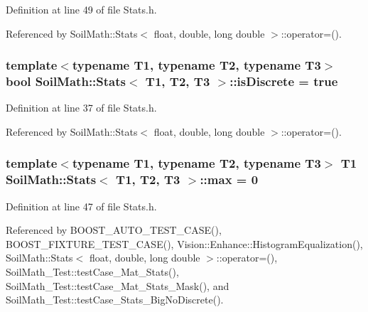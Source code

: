 Definition at line 49 of file Stats.\+h.



Referenced by Soil\+Math\+::\+Stats$<$ float, double, long double $>$\+::operator=().

\hypertarget{class_soil_math_1_1_stats_a2f54bbc8d815345b23ebbd4ba2b302bf}{}
\subsubsection[{is\+Discrete}]{\setlength{\rightskip}{0pt plus 5cm}template$<$typename T1, typename T2, typename T3$>$ bool {\bf Soil\+Math\+::\+Stats}$<$ T1, T2, T3 $>$\+::is\+Discrete = true}\label{class_soil_math_1_1_stats_a2f54bbc8d815345b23ebbd4ba2b302bf}


Definition at line 37 of file Stats.\+h.



Referenced by Soil\+Math\+::\+Stats$<$ float, double, long double $>$\+::operator=().

\hypertarget{class_soil_math_1_1_stats_ad49ee1f533564ec587cf98a094b8c564}{}
\subsubsection[{max}]{\setlength{\rightskip}{0pt plus 5cm}template$<$typename T1, typename T2, typename T3$>$ T1 {\bf Soil\+Math\+::\+Stats}$<$ T1, T2, T3 $>$\+::max = 0}\label{class_soil_math_1_1_stats_ad49ee1f533564ec587cf98a094b8c564}


Definition at line 47 of file Stats.\+h.



Referenced by B\+O\+O\+S\+T\+\_\+\+A\+U\+T\+O\+\_\+\+T\+E\+S\+T\+\_\+\+C\+A\+S\+E(), B\+O\+O\+S\+T\+\_\+\+F\+I\+X\+T\+U\+R\+E\+\_\+\+T\+E\+S\+T\+\_\+\+C\+A\+S\+E(), Vision\+::\+Enhance\+::\+Histogram\+Equalization(), Soil\+Math\+::\+Stats$<$ float, double, long double $>$\+::operator=(), Soil\+Math\+\_\+\+Test\+::test\+Case\+\_\+\+Mat\+\_\+\+Stats(), Soil\+Math\+\_\+\+Test\+::test\+Case\+\_\+\+Mat\+\_\+\+Stats\+\_\+\+Mask(), and Soil\+Math\+\_\+\+Test\+::test\+Case\+\_\+\+Stats\+\_\+\+Big\+No\+Discrete().

\hypertarget{class_soil_math_1_1_stats_a6f53982d52cf492ddd4df9b56bd014e7}{}
